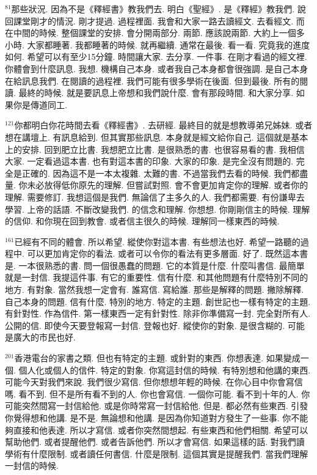 \documentclass{book}
\begin{document}
$^{81}$那些狀況.
因為不是《釋經書》教我們去.
明白《聖經》.
是《釋經》教我們.
說回課堂剛才的情況.
剛才提過.
過程裡面.
我會和大家一路去讀經文.
去看經文.
而在中間的時候.
整個課堂的安排.
會分開兩部分.
兩節.
應該說兩節.
大約上一個多小時.
大家都睡著.
我都睡著的時候.
就再繼續.
通常在最後.
看一看.
究竟我的進度如何.
希望可以有至少15分鐘.
時間讓大家.
去分享.
一件事.
在剛才看過的經文裡.
你體會到什麼訊息.
我想.
機構自己本身.
或者我自己本身都會很強調.
是自己本身在給訊息我們.
在閱讀的過程裡.
我們可能有很多學術在後面.
但到最後.
所有的閱讀.
最終的時候.
就是要訊息上帝想和我們說什麼.
會有那段時間.
和大家分享.
如果你是傳道同工.

$^{121}$你都明白你花時間去看《釋經書》.
去研經.
最終目的就是想教導弟兄姊妹.
或者想在講壇上.
有訊息給到.
但其實那些訊息.
本身就是經文給你自己.
這個就是基本上的安排.
回到肥立比書.
我想肥立比書.
是很熟悉的書.
也很容易看的書.
我相信大家.
一定看過這本書.
也有對這本書的印象.
大家的印象.
是完全沒有問題的.
完全是正確的.
因為這不是一本太複雜.
太難的書.
不過當我們去看的時候.
我們都盡量.
你未必放得低你原先的理解.
但嘗試對照.
會不會更加肯定你的理解.
或者你的理解.
需要修訂.
我想這個是我們.
無論信了主多久的人.
我們都需要.
有份謙卑去學習.
上帝的話語.
不斷改變我們.
的信念和理解.
你想想.
你剛剛信主的時候.
理解的信仰.
和你現在回到教會.
或者信主很久的時候.
理解同一樣東西的時候.

$^{161}$已經有不同的體會.
所以希望.
縱使你對這本書.
有些想法也好.
希望一路聽的過程中.
可以更加肯定你的看法.
或者可以令你的看法有更多層面.
好了.
既然這本書是.
一本很熟悉的書.
問一個很愚蠢的問題.
它的本質是什麼.
什麼叫書信.
最簡單就是一封信.
我提這件事.
有它的重要性.
信有什麼.
和其他問題有什麼特別不同的地方.
有對象.
當然我想一定會有.
誰寫信.
寫給誰.
那些是解釋的問題.
撇除解釋.
自己本身的問題.
信有什麼.
特別的地方.
特定的主題.
創世記也一樣有特定的主題.
有針對性.
作為信件.
第一樣東西一定有針對性.
除非你準備寫一封.
完全對所有人.
公開的信.
即使今天要登報寫一封信.
登報也好.
縱使你的對象.
是很含糊的.
可能是廣大的市民也好.

$^{201}$香港電台的家書之類.
但也有特定的主題.
或針對的東西.
你想表達.
如果變成一個.
個人化或個人的信件.
特定的對象.
你寫這封信的時候.
有特別想和他講的東西.
可能今天對我們來說.
我們很少寫信.
但你想想年輕的時候.
在你心目中你會寫信嗎.
看不到.
但不是所有看不到的人.
你也會寫信.
一個你可能.
看不到十年的人.
你可能突然間寫一封信給他.
或是你時常寫一封信給他.
但是.
都必然有些東西.
引發你覺得想和他講.
是不是.
無論想和他講.
是因為你知道對方發生了一些事.
你不能夠直接和他表達.
所以才寫信.
或者你突然間想起.
有些東西和他們相關.
希望可以幫助他們.
或者提醒他們.
或者告訴他們.
所以才會寫信.
如果這樣的話.
對我們讀學術有什麼限制.
或者讀任何書信.
什麼是限制.
這個其實是提醒我們.
當我們理解一封信的時候.
\end{document}
